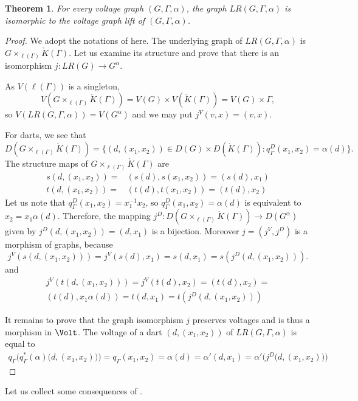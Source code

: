 \documentclass{amsart}
\newtheorem{theorem}{Theorem}[section]
\theoremstyle{definition}
\newcommand{\KG}{{\mathring{K}(Γ)}}
\newcommand{\lG}{{\ell(Γ)}}
\newcommand{\pb}[3]{{#1}×_{#2}{#3}}
\begin{document}
\begin{theorem}
\label{thm:LRisderived}
For every voltage graph $(G,Γ,α)$,
the graph $LR(G,Γ,α)$ is isomorphic to the voltage graph lift of $(G,Γ,α)$. 
\end{theorem}
\begin{proof}
We adopt the notations of  here.
The underlying graph of $LR(G,Γ,α)$ is $\pb{G}{\lG}{\KG}$. Let us examine
its structure and prove that there is an isomorphism $j\colon LR(G)\to G^α$. 

As $V(\lG)$ is a singleton, 
$$
V(\pb{G}{\lG}{\KG})=V(G)×V(\KG)=V(G)×Γ,
$$ 
so $V(LR(G,Γ,α))=V(G^α)$ and we may put $j^V(v,x)=(v,x)$.

For darts, we see that
$$
D(\pb{G}{\lG}{\KG})=\{(d,(x_1,x_2))\in D(G)×D(\KG):q_Γ^D(x_1,x_2)=\alpha(d)\}.
$$
The structure maps of $\pb{G}{\lG}{\KG}$ are
\begin{align*}
s(d,(x_1,x_2))=&(s(d),s(x_1,x_2))=(s(d),x_1)\\
t(d,(x_1,x_2))=&(t(d),t(x_1,x_2))=(t(d),x_2)
\end{align*}
Let us note that $q_Γ^D(x_1,x_2)=x_1^{-1}x_2$, so
$q_Γ^D(x_1,x_2)=α(d)$ is equivalent to
$x_2=x_1α(d)$.
Therefore, the mapping
$j^D\colon D(\pb{G}{\lG}{\KG})\to D(G^α)$ given by
$j^D(d,(x_1,x_2))=(d,x_1)$ is a bijection. Moreover $j=(j^V,j^D)$ is a morphism
of graphs, because
\[
j^V(s(d,(x_1,x_2)))=j^V(s(d),x_1)=s(d,x_1)=s(j^D(d,(x_1,x_2))).
\]
and
\begin{multline*}
j^V(t(d,(x_1,x_2)))=j^V(t(d),x_2)=(t(d),x_2)=\\(t(d),x_1α(d))=t(d,x_1)=
t(j^D(d,(x_1,x_2)))
\end{multline*}

It remains to prove that the graph isomorphism $j$ preserves voltages and is thus a
morphism in $\Volt$.
The voltage of a dart $(d,(x_1,x_2))$ of $LR(G,Γ,α)$ is equal to
\begin{multline*}
q_Γ\bigl(q_Γ^*(α)\bigl(d,(x_1,x_2)\bigr)\bigr)=q_Γ(x_1,x_2)=α(d)=
α'(d,x_1)=α'\bigl(j^D\bigl(d,(x_1,x_2)\bigr)\bigr)
\end{multline*}
\end{proof}

Let us collect some consequences of .
\end{document}
